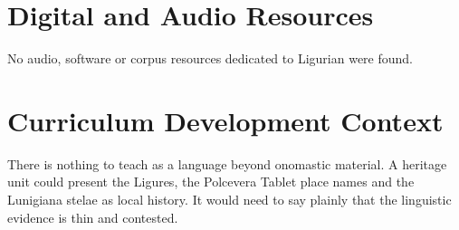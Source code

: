 \documentclass[12pt]{article}
\begin{document}
\section{Digital and Audio Resources}
No audio, software or corpus resources dedicated to Ligurian were found.

\section{Curriculum Development Context}
There is nothing to teach as a language beyond onomastic material. A heritage unit could present the Ligures, the Polcevera Tablet place names and the Lunigiana stelae as local history. It would need to say plainly that the linguistic evidence is thin and contested.
\end{document}

